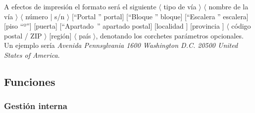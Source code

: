 \documentclass[11pt, a4paper, twoside, titlepage]{article}
\begin{document}
				A efectos de impresión el formato será el siguiente {\texttt {} $\langle$ tipo de vía $\rangle$ $\langle$ nombre de la vía $\rangle$ $\langle$ número | s/n $\rangle$ [``Portal ''  portal] [``Bloque ''  bloque] [``Escalera ''  escalera] [piso ``º''] [puerta] [``Apartado~'' apartado postal] [localidad ] [provincia ] $\langle$ código postal / ZIP $\rangle$ [región] $\langle$ país $\rangle$}, denotando los corchetes parámetros opcionales.\\
	
				Un ejemplo sería {\itshape Avenida Pennsylvania 1600 Washington D.C. 20500 United States of America}.
		
		\startcontents[tocfunciones]

		\subsection{Funciones}
			\subsubsection{Gestión interna}
				

				

				
			
				

				

				

				

				

				

				

				
				
				
\end{document}
